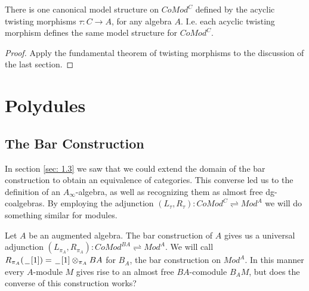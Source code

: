 \documentclass[../thesis.tex]{subfiles}
\begin{document}
            \begin{corollary}
                There is one canonical model structure on $CoMod^C$ defined by the acyclic twisting morphisms $\tau : C \rightarrow A$, for any algebra $A$. I.e. each acyclic twisting morphism defines the same model structure for $CoMod^C$. 
            \end{corollary}

            \begin{proof}
                Apply the fundamental theorem of twisting morphisms to the discussion of the last section.
            \end{proof}

    \section{Polydules}
        \subsection{The Bar Construction}
            In section \ref{sec: 1.3} we saw that we could extend the domain of the bar construction to obtain an equivalence of categories. This converse led us to the definition of an $A_\infty$-algebra, as well as recognizing them as almost free dg-coalgebras. By employing the adjunction $(L_\tau, R_\tau) : CoMod^C \rightleftharpoons Mod^A$ we will do something similar for modules.

            Let $A$ be an augmented algebra. The bar construction of $A$ gives us a universal adjunction $(L_{\pi_A}, R_{\pi_A}) : CoMod^{BA} \rightleftharpoons Mod^A$. We will call $R_{\pi_A}(\hspace{0.05cm}\underline{\hspace{0.2cm}}\hspace{0.05cm} [1]) = \hspace{0.05cm}\underline{\hspace{0.2cm}}\hspace{0.05cm} [1]\otimes_{\pi_A}BA$ for $B_A$, the bar construction on $Mod^A$. In this manner every $A$-module $M$ gives rise to an almost free $BA$-comodule $B_AM$, but does the converse of this construction works?
\end{document}
